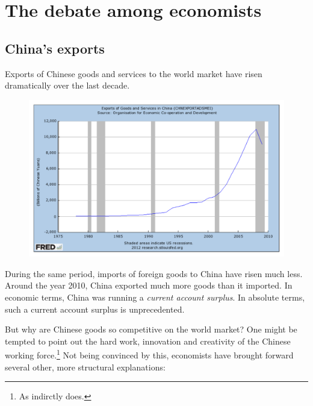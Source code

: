 \documentclass[11pt]{article}
\begin{document}
\setlength{\parindent}{0pt}

\tableofcontents
\section{The debate among economists}

\subsection{China's exports}

Exports of Chinese goods and services to the world market have risen dramatically over the last decade. %
   
     \begin{figure}[h]
     \begin{center}
     \includegraphics[width=1\textwidth]{ExportsChinaFRED.pdf}
     \end{center}
     \end{figure}

During the same period, imports of foreign goods to China have risen much less. Around the year 2010, China exported much more goods than it imported. In economic terms, China was running a \emph{current account surplus}. In absolute terms, such a current account surplus  is unprecedented. %

But why are Chinese goods so competitive on the world market? One might be tempted to point out the hard work, innovation and creativity of the Chinese working force.\footnote{As \cite[p. 18]{Yu2010} indirctly does.} Not being convinced by this, economists have brought forward several other, more structural explanations:
\end{document}
